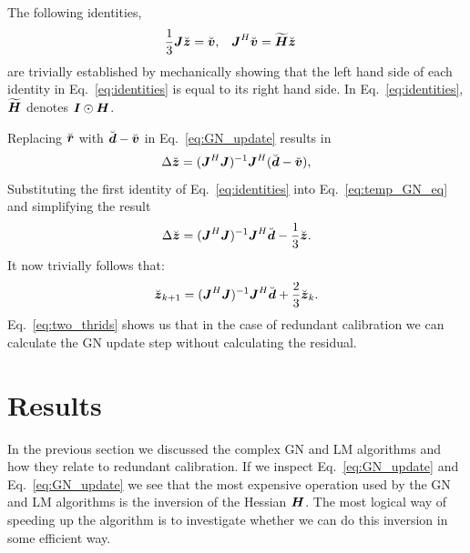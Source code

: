 \documentclass[useAMS,usenatbib]{mn2e}
\newcommand{\bz}{\bmath{z}}
\newcommand{\br}{\bmath{r}}
\newcommand{\bg}{\bmath{g}}
\newcommand{\bd}{\bmath{d}}
\newcommand{\bv}{\bmath{v}}
\newcommand{\bJ}{\bmath{J}}
\newcommand{\bH}{\bmath{H}}
\newcommand{\bI}{\bmath{I}}
\newcommand{\conj}[1]{\overline{#1}}
\begin{document}
The following identities,
\begin{align}
\label{eq:identities}
\frac{1}{3}\bJ\breve{\bz} &= \breve{\bv}, & \bJ^H\breve{\bv} &= \widetilde{\bH}\breve{\bz} 
\end{align}
are trivially established by mechanically showing that the left hand side of each identity in Eq.~\eqref{eq:identities} is equal to its right hand side.
In Eq.~\eqref{eq:identities}, $\widetilde{\bH}$ denotes $\bI\odot\bH$.

Replacing $\breve{\br}$ with $\breve{\bd}-\breve{\bv}$ in Eq.~\eqref{eq:GN_update} results in
\begin{equation}
\label{eq:temp_GN_eq}
\Delta \breve{\bz} = (\bJ^H\bJ)^{-1}\bJ^H(\breve{\bd}-\breve{\bv}), 
\end{equation}
Substituting the first identity of Eq.~\eqref{eq:identities} into Eq.~\eqref{eq:temp_GN_eq} and simplifying the result 
\begin{equation}
\label{eq:one_thrid}
\Delta \breve{\bz} = (\bJ^H\bJ)^{-1}\bJ^H\breve{\bd}-\frac{1}{3}\breve{\bz}.
\end{equation}
It now trivially follows that:
\begin{equation}
\label{eq:two_thrids}
\breve{\bz}_{k+1} = (\bJ^H\bJ)^{-1}\bJ^H\breve{\bd} + \frac{2}{3}\breve{\bz}_{k}. 
\end{equation}
Eq.~\eqref{eq:two_thrids} shows us that in the case of redundant calibration we can calculate the GN update step without calculating the residual. 
% 

\section{Results}
\label{sec:results}
In the previous section we discussed the complex GN and LM algorithms and how they relate to redundant calibration. If we inspect Eq.~\eqref{eq:GN_update} and 
Eq.~\eqref{eq:GN_update} we see that the most expensive operation used by the GN and LM algorithms is the inversion of the Hessian $\bH$. The most logical 
way of speeding up the algorithm is to investigate whether we can do this inversion in some efficient way.
\end{document}
